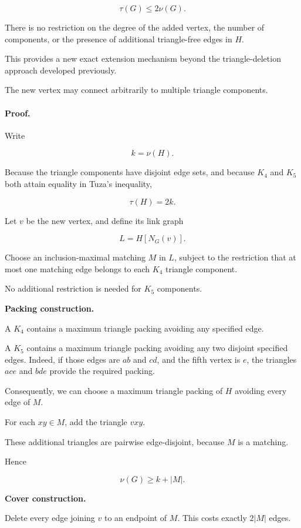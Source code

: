 \documentclass[11pt]{article}
\begin{document}
\[
\boxed{\tau(G)\leq2\nu(G).}
\]

There is no restriction on the degree of the added vertex, the number of components, or the presence of additional triangle-free edges in \(H\).

This provides a new exact extension mechanism beyond the triangle-deletion approach developed previously.

The new vertex may connect arbitrarily to multiple triangle components.

\paragraph{Proof.}

Write

\[
k=\nu(H).
\]

Because the triangle components have disjoint edge sets, and because \(K_4\) and \(K_5\) both attain equality in Tuza's inequality,

\[
\tau(H)=2k.
\]

Let \(v\) be the new vertex, and define its link graph

\[
L=H[N_G(v)].
\]

Choose an inclusion-maximal matching \(M\) in \(L\), subject to the restriction that at most one matching edge belongs to each \(K_4\) triangle component.

No additional restriction is needed for \(K_5\) components.

\textbf{Packing construction.}

A \(K_4\) contains a maximum triangle packing avoiding any specified edge.

A \(K_5\) contains a maximum triangle packing avoiding any two disjoint specified edges. Indeed, if those edges are \(ab\) and \(cd\), and the fifth vertex is \(e\), the triangles \(ace\) and \(bde\) provide the required packing.

Consequently, we can choose a maximum triangle packing of \(H\) avoiding every edge of \(M\).

For each \(xy\in M\), add the triangle \(vxy\).

These additional triangles are pairwise edge-disjoint, because \(M\) is a matching.

Hence

\[
\nu(G)\geq k+|M|.
\]

\textbf{Cover construction.}

Delete every edge joining \(v\) to an endpoint of \(M\). This costs exactly \(2|M|\) edges.
\end{document}
